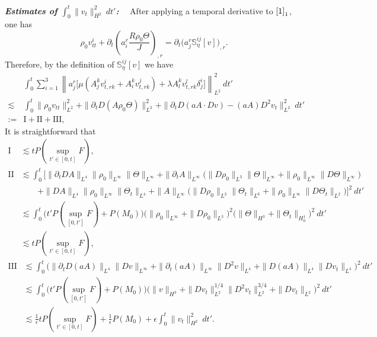 \documentclass[12pt,a4paper]{amsart}
\numberwithin{equation}{section}
\theoremstyle{plain}
\theoremstyle{definition}
\begin{document}
\vspace{0.3cm}
\textsl{\textbf{Estimates of $\int_{0}^{t}\| v_t\|_{H^2}^2\ dt'$:}}~~
After applying a temporal derivative to $\eqref{1}_1$, one has
$$
\rho_0v^i_{tt}+\partial_t \left(a^r_i \frac{R\rho_0\Theta}{J}\right)_{,r}=\partial_t \Big(a^r_j \mathbb{S}^{ij}_{\eta}[v]\Big)_{,r}.
$$
Therefore, by the definition of $\mathbb{S}^{ij}_{\eta}[v]$ we have
\begin{align*}
&\int_{0}^{t}\sum\limits_{i=1}^3\left\| a^r_j\Big[\mu (A^{k}_j  v^i_{t,rk}+A^k_i  v^j_{t,rk})+\lambda A_l^k  v^l_{t,rk}\delta^i_j\Big]   \right\|_{L^2}^2 \ dt'\\
\lesssim & \int_{0}^{t} \|\rho_0 v_{tt}\|_{L^2}^2
   +\| \partial_t D(A\rho_0\Theta)\|_{L^2}^2
   +\| \partial_t D(a A \cdot Dv)- (aA) D^2v_t\|_{L^2}^2\ dt'\\
:=&\mathrm{I}+\mathrm{II}+\mathrm{III},
\end{align*}
It is straightforward that
\begin{align*}
\mathrm{I}&\lesssim tP(\sup\limits_{t'\in[0,t]}F),\\
\mathrm{II}&\lesssim \int_{0}^{t} \bigg[\|\partial_t D A\|_{L^4} \|\rho_0\|_{L^{\infty}} \|\Theta\|_{ L^{\infty}}
 +\|\partial_t A\|_{ L^{\infty}}\Big(\|D\rho_0\|_{ L^3} \|\Theta\|_{ L^{\infty}}+\|\rho_0\|_{L^{\infty}} \|D\Theta\|_{ L^{\infty}}\Big)\\
&\qquad  +\|DA\|_{L^4} \|\rho_0\|_{L^{\infty}} \| \Theta_t\|_{ L^4}+ \|A\|_{L^{\infty}}\Big( \| D\rho_0\|_{L^3} \|\Theta_t\|_{ L^6}+\|\rho_0\|_{ L^{\infty}} \|D\Theta_t\|_{ L^2}\Big)\bigg]^2\ dt'\\
&\lesssim \int_{0}^{t} \Big( t'P(\sup\limits_{[0,t']}F)+P(M_0)  \Big)\Big(\|\rho_0\|_{L^{\infty}}+\|D\rho_0\|_{L^3}\Big)^2
\Big(\|\Theta\|_{H^3}+\|\Theta_t\|_{H_0^1}\Big)^2 \ dt'\\
&\lesssim tP(\sup\limits_{t'\in[0,t]}F),
\end{align*}
\begin{align*}
\mathrm{III}&\lesssim \int_{0}^{t}  \Big(\|\partial_t D(aA)\|_{L^4}\|Dv\|_{L^{\infty}}
+\|\partial_t (aA)\|_{L^{\infty}}\|D^2 v\|_{L^4}
+\|D (aA)\|_{L^4} \| Dv_t \|_{L^4}\Big)^2 \ dt'\\
&\lesssim \int_{0}^{t} \Big( t'P(\sup\limits_{[0,t']}F)+P(M_0)  \Big)
\Big(\|v\|_{H^3}+\|Dv_t\|_{L^2}^{1/4}\|D^2v_t\|_{L^2}^{3/4}+\|Dv_t\|_{L^2}\Big)^2 \ dt'\\
&\lesssim  \frac{1}{\epsilon}tP(\sup\limits_{t'\in[0,t]}F)+\frac{1}{\epsilon}P(M_0)+\epsilon \int_{0}^{t}\| v_t \|_{H^2}^2\ dt'.
\end{align*}
\end{document}
